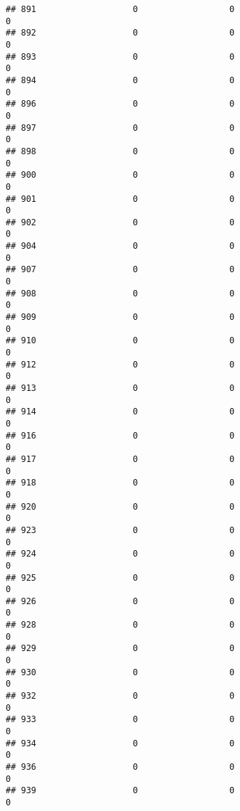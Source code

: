 \documentclass[
]{article}
\begin{document}
\begin{verbatim}
## 891                   0                  0                              0
## 892                   0                  0                              0
## 893                   0                  0                              0
## 894                   0                  0                              0
## 896                   0                  0                              0
## 897                   0                  0                              0
## 898                   0                  0                              0
## 900                   0                  0                              0
## 901                   0                  0                              0
## 902                   0                  0                              0
## 904                   0                  0                              0
## 907                   0                  0                              0
## 908                   0                  0                              0
## 909                   0                  0                              0
## 910                   0                  0                              0
## 912                   0                  0                              0
## 913                   0                  0                              0
## 914                   0                  0                              0
## 916                   0                  0                              0
## 917                   0                  0                              0
## 918                   0                  0                              0
## 920                   0                  0                              0
## 923                   0                  0                              0
## 924                   0                  0                              0
## 925                   0                  0                              0
## 926                   0                  0                              0
## 928                   0                  0                              0
## 929                   0                  0                              0
## 930                   0                  0                              0
## 932                   0                  0                              0
## 933                   0                  0                              0
## 934                   0                  0                              0
## 936                   0                  0                              0
## 939                   0                  0                              0

\end{verbatim}
\end{document}
